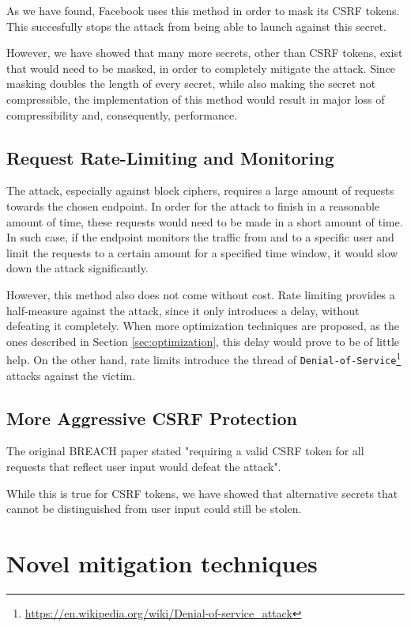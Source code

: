 As we have found, Facebook uses this method in order to mask its CSRF tokens.
This succesfully stops the attack from being able to launch against this secret.

However, we have showed that many more secrets, other than CSRF tokens, exist
that would need to be masked, in order to completely mitigate the attack. Since
masking doubles the length of every secret, while also making the secret not
compressible, the implementation of this method would result in major loss of
compressibility and, consequently, performance.

\subsection{Request Rate-Limiting and Monitoring}

The attack, especially against block ciphers, requires a large amount of
requests towards the chosen endpoint. In order for the attack to finish in a
reasonable amount of time, these requests would need to be made in a short
amount of time. In such case, if the endpoint monitors the traffic from and to a
specific user and limit the requests to a certain amount for a specified time
window, it would slow down the attack significantly.

However, this method also does not come without cost. Rate limiting provides a
half-measure against the attack, since it only introduces a delay, without
defeating it completely. When more optimization techniques are proposed, as the
ones described in Section \ref{sec:optimization}, this delay would prove to be
of little help. On the other hand, rate limits introduce the thread of
\texttt{Denial-of-Service}\footnote{\url{https://en.wikipedia.org/wiki/Denial-of-service_attack}}
attacks against the victim.

\subsection{More Aggressive CSRF Protection}

The original BREACH paper stated "requiring a valid CSRF token for all requests
that reflect user input would defeat the attack".

While this is true for CSRF tokens, we have showed that alternative secrets that
cannot be distinguished from user input could still be stolen.

\section{Novel mitigation techniques}\label{sec:novel_mitigation}

